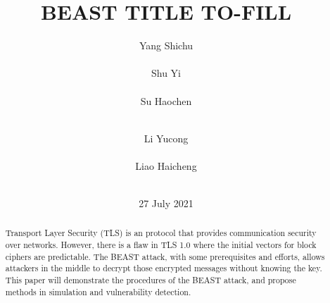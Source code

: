 \documentclass{acm_proc_article-sp}
\begin{document}
\title{
BEAST TITLE TO-FILL
}
\author{
\alignauthor
Yang Shichu\\
    \\
\alignauthor
Shu Yi\\
    \\
\alignauthor
Su Haochen\\
    \\
\and
\alignauthor
Li Yucong\\
    \\
\alignauthor
Liao Haicheng\\
    \\
}
\date{27 July 2021}
\maketitle
\begin{abstract}
Transport Layer Security (TLS) is an protocol that provides communication
security over networks. However, there is a flaw in TLS 1.0 where the initial
vectors for block ciphers are predictable. The BEAST attack, with some
prerequisites and efforts, allows attackers in the middle to decrypt those
encrypted messages without knowing the key.
This paper will demonstrate the procedures of the BEAST attack, and propose
methods in simulation and vulnerability detection.
\end{abstract}



\end{document}
